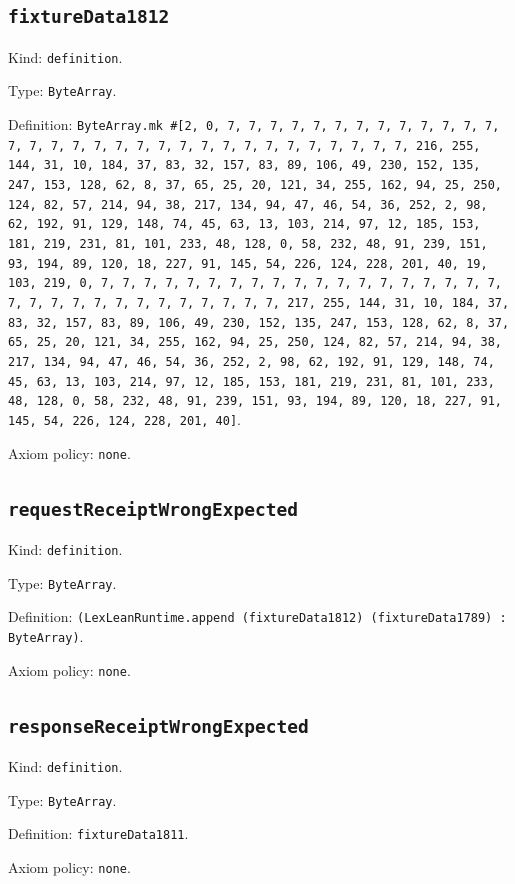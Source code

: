 \documentclass[11pt]{article}
\begin{document}
\subsection*{\texttt{fixtureData1812}}
\noindent Kind: \texttt{definition}.\par
\noindent Type: \texttt{ByteArray}.\par
\noindent Definition: \texttt{ByteArray.mk \#[2, 0, 7, 7, 7, 7, 7, 7, 7, 7, 7, 7, 7, 7, 7, 7, 7, 7, 7, 7, 7, 7, 7, 7, 7, 7, 7, 7, 7, 7, 7, 7, 7, 7, 216, 255, 144, 31, 10, 184, 37, 83, 32, 157, 83, 89, 106, 49, 230, 152, 135, 247, 153, 128, 62, 8, 37, 65, 25, 20, 121, 34, 255, 162, 94, 25, 250, 124, 82, 57, 214, 94, 38, 217, 134, 94, 47, 46, 54, 36, 252, 2, 98, 62, 192, 91, 129, 148, 74, 45, 63, 13, 103, 214, 97, 12, 185, 153, 181, 219, 231, 81, 101, 233, 48, 128, 0, 58, 232, 48, 91, 239, 151, 93, 194, 89, 120, 18, 227, 91, 145, 54, 226, 124, 228, 201, 40, 19, 103, 219, 0, 7, 7, 7, 7, 7, 7, 7, 7, 7, 7, 7, 7, 7, 7, 7, 7, 7, 7, 7, 7, 7, 7, 7, 7, 7, 7, 7, 7, 7, 7, 7, 7, 217, 255, 144, 31, 10, 184, 37, 83, 32, 157, 83, 89, 106, 49, 230, 152, 135, 247, 153, 128, 62, 8, 37, 65, 25, 20, 121, 34, 255, 162, 94, 25, 250, 124, 82, 57, 214, 94, 38, 217, 134, 94, 47, 46, 54, 36, 252, 2, 98, 62, 192, 91, 129, 148, 74, 45, 63, 13, 103, 214, 97, 12, 185, 153, 181, 219, 231, 81, 101, 233, 48, 128, 0, 58, 232, 48, 91, 239, 151, 93, 194, 89, 120, 18, 227, 91, 145, 54, 226, 124, 228, 201, 40]}.\par
\noindent Axiom policy: \texttt{none}.\par
\subsection*{\texttt{requestReceiptWrongExpected}}
\noindent Kind: \texttt{definition}.\par
\noindent Type: \texttt{ByteArray}.\par
\noindent Definition: \texttt{(LexLeanRuntime.append (fixtureData1812) (fixtureData1789) : ByteArray)}.\par
\noindent Axiom policy: \texttt{none}.\par
\subsection*{\texttt{responseReceiptWrongExpected}}
\noindent Kind: \texttt{definition}.\par
\noindent Type: \texttt{ByteArray}.\par
\noindent Definition: \texttt{fixtureData1811}.\par
\noindent Axiom policy: \texttt{none}.\par
\end{document}
